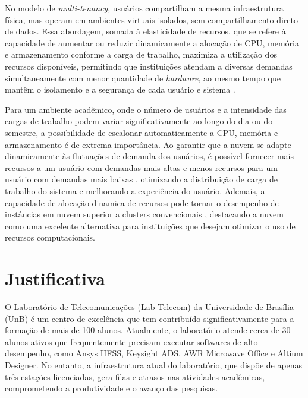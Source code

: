 No modelo de \textit{multi-tenancy}, usuários compartilham a mesma infraestrutura física, mas operam em ambientes virtuais isolados, sem compartilhamento direto de dados. Essa abordagem, somada à elasticidade de recursos, que se refere à capacidade de aumentar ou reduzir dinamicamente a alocação de CPU, memória e armazenamento conforme a carga de trabalho, maximiza a utilização dos recursos disponíveis, permitindo que instituições atendam a diversas demandas simultaneamente com menor quantidade de \textit{hardware}, ao mesmo tempo que mantêm o isolamento e a segurança de cada usuário e sistema \cite{heuchert2021}.

Para um ambiente acadêmico, onde o número de usuários e a intensidade das cargas de trabalho podem variar significativamente ao longo do dia ou do semestre, a possibilidade de escalonar automaticamente a CPU, memória e armazenamento é de extrema importância. Ao garantir que a nuvem se adapte dinamicamente às flutuações de demanda dos usuários, é possível fornecer mais recursos a um usuário com demandas mais altas e menos recursos para um usuário com demandas mais baixas \cite{armbrust2010; oliveira2015}, otimizando a distribuição de carga de trabalho do sistema e melhorando a experiência do usuário. Ademais, a capacidade de alocação dinamica de recursos pode tornar o desempenho de instâncias em nuvem superior a clusters convencionais \cite{roloff2012}, destacando a nuvem como uma excelente alternativa para instituições que desejam otimizar o uso de recursos computacionais.

\section{Justificativa}

O Laboratório de Telecomunicações (Lab Telecom) da Universidade de Brasília (UnB) é um centro de excelência que tem contribuído significativamente para a formação de mais de 100 alunos. Atualmente, o laboratório atende cerca de 30 alunos ativos que frequentemente precisam executar softwares de alto desempenho, como Ansys HFSS, Keysight ADS, AWR Microwave Office e Altium Designer. No entanto, a infraestrutura atual do laboratório, que dispõe de apenas três estações licenciadas, gera filas e atrasos nas atividades acadêmicas, comprometendo a produtividade e o avanço das pesquisas.

